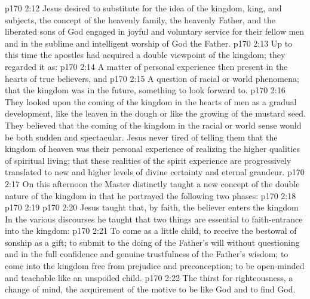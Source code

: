 \vs p170 2:12 Jesus desired to substitute for the idea of the kingdom, king, and subjects, the concept of the heavenly family, the heavenly Father, and the liberated sons of God engaged in joyful and voluntary service for their fellow men and in the sublime and intelligent worship of God the Father.
\vs p170 2:13 Up to this time the apostles had acquired a double viewpoint of the kingdom; they regarded it as:
\vs p170 2:14 \bibnobreakspace A matter of personal experience then present in the hearts of true believers, and
\vs p170 2:15 \bibnobreakspace A question of racial or world phenomena; that the kingdom was in the future, something to look forward to.
\vs p170 2:16 \pc They looked upon the coming of the kingdom in the hearts of men as a gradual development, like the leaven in the dough or like the growing of the mustard seed. They believed that the coming of the kingdom in the racial or world sense would be both sudden and spectacular. Jesus never tired of telling them that the kingdom of heaven was their personal experience of realizing the higher qualities of spiritual living; that these realities of the spirit experience are progressively translated to new and higher levels of divine certainty and eternal grandeur.
\vs p170 2:17 On this afternoon the Master distinctly taught a new concept of the double nature of the kingdom in that he portrayed the following two phases:
\vs p170 2:18 
\vs p170 2:19 
\vs p170 2:20 Jesus taught that, by faith, the believer enters the kingdom  In the various discourses he taught that two things are essential to faith\hyp{}entrance into the kingdom:
\vs p170 2:21 \bibnobreakspace {} To come as a little child, to receive the bestowal of sonship as a gift; to submit to the doing of the Father’s will without questioning and in the full confidence and genuine trustfulness of the Father’s wisdom; to come into the kingdom free from prejudice and preconception; to be open\hyp{}minded and teachable like an unspoiled child.
\vs p170 2:22 \bibnobreakspace {} The thirst for righteousness, a change of mind, the acquirement of the motive to be like God and to find God.
